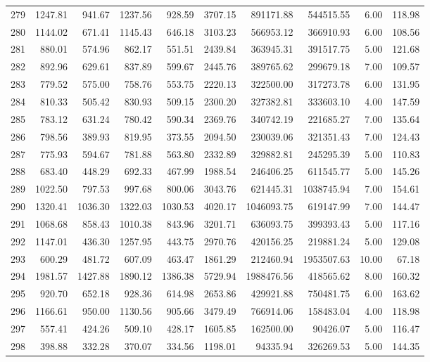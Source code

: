 \begin{tabular}{lrrrrrrrrr}
279 & 1247.81 & 941.67 & 1237.56 & 928.59 & 3707.15 & 891171.88 & 544515.55 & 6.00 & 118.98 \\
280 & 1144.02 & 671.41 & 1145.43 & 646.18 & 3103.23 & 566953.12 & 366910.93 & 6.00 & 108.56 \\
281 & 880.01 & 574.96 & 862.17 & 551.51 & 2439.84 & 363945.31 & 391517.75 & 5.00 & 121.68 \\
282 & 892.96 & 629.61 & 837.89 & 599.67 & 2445.76 & 389765.62 & 299679.18 & 7.00 & 109.57 \\
283 & 779.52 & 575.00 & 758.76 & 553.75 & 2220.13 & 322500.00 & 317273.78 & 6.00 & 131.95 \\
284 & 810.33 & 505.42 & 830.93 & 509.15 & 2300.20 & 327382.81 & 333603.10 & 4.00 & 147.59 \\
285 & 783.12 & 631.24 & 780.42 & 590.34 & 2369.76 & 340742.19 & 221685.27 & 7.00 & 135.64 \\
286 & 798.56 & 389.93 & 819.95 & 373.55 & 2094.50 & 230039.06 & 321351.43 & 7.00 & 124.43 \\
287 & 775.93 & 594.67 & 781.88 & 563.80 & 2332.89 & 329882.81 & 245295.39 & 5.00 & 110.83 \\
288 & 683.40 & 448.29 & 692.33 & 467.99 & 1988.54 & 246406.25 & 611545.77 & 5.00 & 145.26 \\
289 & 1022.50 & 797.53 & 997.68 & 800.06 & 3043.76 & 621445.31 & 1038745.94 & 7.00 & 154.61 \\
290 & 1320.41 & 1036.30 & 1322.03 & 1030.53 & 4020.17 & 1046093.75 & 619147.99 & 7.00 & 144.47 \\
291 & 1068.68 & 858.43 & 1010.38 & 843.96 & 3201.71 & 636093.75 & 399393.43 & 5.00 & 117.16 \\
292 & 1147.01 & 436.30 & 1257.95 & 443.75 & 2970.76 & 420156.25 & 219881.24 & 5.00 & 129.08 \\
293 & 600.29 & 481.72 & 607.09 & 463.47 & 1861.29 & 212460.94 & 1953507.63 & 10.00 & 67.18 \\
294 & 1981.57 & 1427.88 & 1890.12 & 1386.38 & 5729.94 & 1988476.56 & 418565.62 & 8.00 & 160.32 \\
295 & 920.70 & 652.18 & 928.36 & 614.98 & 2653.86 & 429921.88 & 750481.75 & 6.00 & 163.62 \\
296 & 1166.61 & 950.00 & 1130.56 & 905.66 & 3479.49 & 766914.06 & 158483.04 & 4.00 & 118.98 \\
297 & 557.41 & 424.26 & 509.10 & 428.17 & 1605.85 & 162500.00 & 90426.07 & 5.00 & 116.47 \\
298 & 398.88 & 332.28 & 370.07 & 334.56 & 1198.01 & 94335.94 & 326269.53 & 5.00 & 144.35 \\

\end{tabular}
